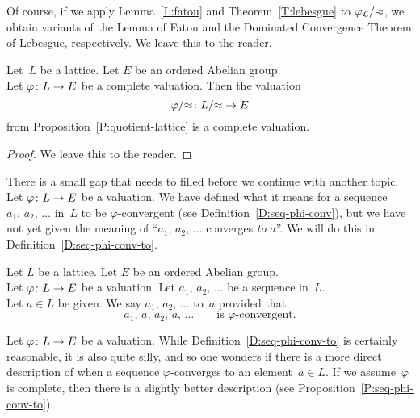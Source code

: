 \documentclass[main.tex]{subfiles}
\begin{document}
Of course,
if we apply
Lemma~\ref{L:fatou}
and Theorem~\ref{T:lebesgue} 
to
$\varphi_{\mathcal{L}}/{\approx}$,
we obtain variants of the Lemma of Fatou
and the Dominated Convergence Theorem of Lebesgue,
respectively. We leave this to the reader.

%
%
\begin{prop}
\label{P:quot-complete}
Let~$L$ be a lattice. Let $E$ be an ordered Abelian group.\\
Let $\varphi\colon L\rightarrow E$ be a complete valuation.
Then the valuation
\begin{equation*}
\varphi/{\approx}\colon L/{\approx} \rightarrow E
\end{equation*}
from Proposition~\ref{P:quotient-lattice}
is a complete valuation.
\end{prop}
\begin{proof}
We leave this to the reader.
\end{proof}

There is a small gap that needs to filled before
we continue with another topic.
Let $\varphi\colon L \rightarrow E$ be a valuation.
We have defined what it means
for a sequence $a_1,\,a_2,\,\dotsc$ in~$L$ to be
$\varphi$-convergent
(see Definition~\ref{D:seq-phi-conv}),
but we have not yet given the meaning of
``$a_1,\,a_2,\,\dotsc$ converges \emph{to} $a$''.
We will do this in Definition~\ref{D:seq-phi-conv-to}.
%
%
\begin{dfn}
\label{D:seq-phi-conv-to}
Let $L$ be a lattice.
Let $E$ be an ordered Abelian group.\\
Let $\varphi\colon L\rightarrow E$ be a valuation.
Let $a_1,\,a_2,\,\dotsc$ be a sequence in~$L$.\\
Let $a\in L$ be given.
We say $a_1,\,a_2,\,\dotsc$
 to~$a$
provided that 
\begin{equation*}
a_1,\,a,\,a_2,\,a,\,\dotsc\qquad\text{is $\varphi$-convergent.}
\end{equation*}
\end{dfn}

Let $\varphi\colon L \rightarrow E$ be a valuation.
While Definition~\ref{D:seq-phi-conv-to} is certainly reasonable,
it is also quite silly, 
and so one wonders if there is a more direct description
of when a sequence $\varphi$-converges to an element~$a\in L$.
If we assume~$\varphi$ is complete,
then there is a slightly 
better description (see Proposition~\ref{P:seq-phi-conv-to}).
\end{document}
